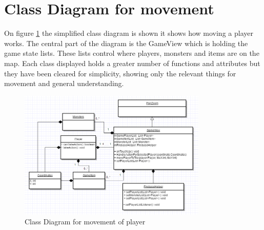 \section{Class Diagram for movement}

On figure \ref{ClassDiagramMovement} the simplified class diagram is shown it shows how moving a player works. The central part of the diagram is the GameView which is holding the game state lists. These lists control where players, monsters and items are on the map. Each class displayed holds a greater number of functions and attributes but they have been cleared for simplicity, showing only the relevant things for movement and general understanding.


\begin{figure}
	\centering
	\includegraphics[width=0.8\textwidth]{images/ClassDiagramMovement.PNG}
	\caption{Class Diagram for movement of player \label{ClassDiagramMovement}}
\end{figure}